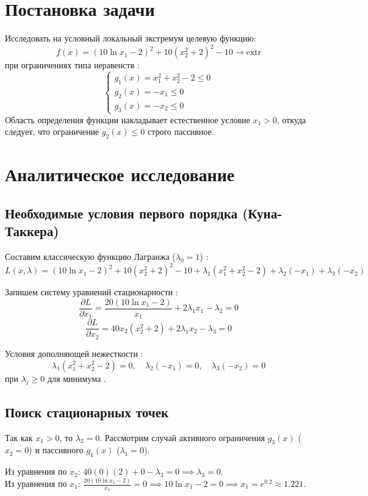 \section{Постановка задачи}
Исследовать на условный локальный экстремум целевую функцию:
$$f(x) = (10\ln x_1 - 2)^2 + 10(x_2^2 + 2)^2 - 10 \rightarrow \text{extr}$$
при ограничениях типа неравенств \cite{cite: 40}:
$$\begin{cases}
    g_1(x) = x_1^2 + x_2^2 - 2 \le 0 \\
    g_2(x) = -x_1 \le 0 \\
    g_3(x) = -x_2 \le 0
\end{cases}$$
Область определения функции накладывает естественное условие $x_1 > 0$, откуда следует, что ограничение $g_2(x) \le 0$ строго пассивное.

\section{Аналитическое исследование}

\subsection{Необходимые условия первого порядка (Куна-Таккера)}
Составим классическую функцию Лагранжа ($\lambda_0=1$) \cite{cite: 70, cite: 94}:
$$L(x, \lambda) = (10\ln x_1 - 2)^2 + 10(x_2^2 + 2)^2 - 10 + \lambda_1(x_1^2 + x_2^2 - 2) + \lambda_2(-x_1) + \lambda_3(-x_2)$$

Запишем систему уравнений стационарности \cite{cite: 98}:
$$\frac{\partial L}{\partial x_1} = \frac{20(10\ln x_1 - 2)}{x_1} + 2\lambda_1 x_1 - \lambda_2 = 0$$
$$\frac{\partial L}{\partial x_2} = 40x_2(x_2^2 + 2) + 2\lambda_1 x_2 - \lambda_3 = 0$$

Условия дополняющей нежесткости \cite{cite: 99}:
$$\lambda_1(x_1^2 + x_2^2 - 2) = 0, \quad \lambda_2(-x_1) = 0, \quad \lambda_3(-x_2) = 0$$
при $\lambda_j \ge 0$ для минимума \cite{cite: 99}.

\subsection{Поиск стационарных точек}
Так как $x_1 > 0$, то $\lambda_2 = 0$. Рассмотрим случай активного ограничения $g_3(x)$ ($x_2 = 0$) и пассивного $g_1(x)$ ($\lambda_1 = 0$).

Из уравнения по $x_2$: $40(0)(2) + 0 - \lambda_3 = 0 \implies \lambda_3 = 0$. \\
Из уравнения по $x_1$: $\frac{20(10\ln x_1 - 2)}{x_1} = 0 \implies 10\ln x_1 - 2 = 0 \implies x_1 = e^{0.2} \approx 1.221$.

